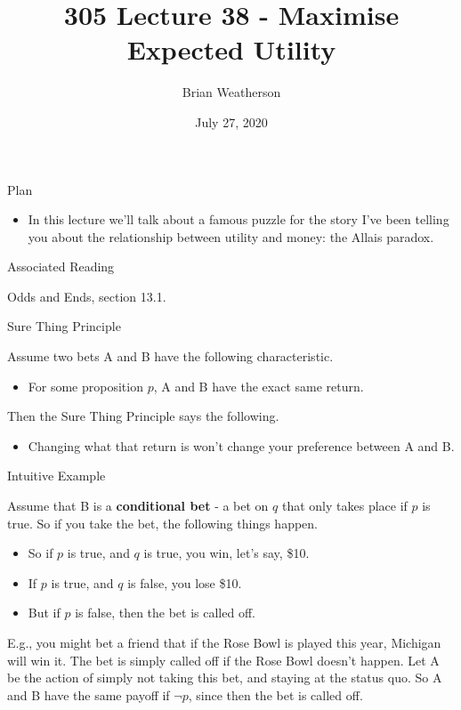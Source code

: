 \documentclass[
  ignorenonframetext,
]{beamer}
\title{305 Lecture 38 - Maximise Expected Utility}
\author{Brian Weatherson}
\date{July 27, 2020}
\providecommand{\tightlist}{%
  \setlength{\itemsep}{0pt}\setlength{\parskip}{0pt}}
\renewcommand{\,}{\text{, }}
\begin{document}
\frame{\titlepage}

\begin{frame}{Plan}
\protect\hypertarget{plan}{}

\begin{itemize}
\tightlist
\item
  In this lecture we'll talk about a famous puzzle for the story I've
  been telling you about the relationship between utility and money: the
  Allais paradox.
\end{itemize}

\end{frame}

\begin{frame}{Associated Reading}
\protect\hypertarget{associated-reading}{}

Odds and Ends, section 13.1.

\end{frame}

\begin{frame}{Sure Thing Principle}
\protect\hypertarget{sure-thing-principle}{}

Assume two bets A and B have the following characteristic.

\begin{itemize}
\tightlist
\item
  For some proposition \(p\), A and B have the exact same return. \pause
\end{itemize}

Then the Sure Thing Principle says the following.

\begin{itemize}
\tightlist
\item
  Changing what that return is won't change your preference between A
  and B.
\end{itemize}

\end{frame}

\begin{frame}{Intuitive Example}
\protect\hypertarget{intuitive-example}{}

Assume that B is a \textbf{conditional bet} - a bet on \(q\) that only
takes place if \(p\) is true. So if you take the bet, the following
things happen.

\begin{itemize}
\tightlist
\item
  So if \(p\) is true, and \(q\) is true, you win, let's say, \$10.
\item
  If \(p\) is true, and \(q\) is false, you lose \$10.
\item
  But if \(p\) is false, then the bet is called off.
\end{itemize}

E.g., you might bet a friend that if the Rose Bowl is played this year,
Michigan will win it. The bet is simply called off if the Rose Bowl
doesn't happen. Let A be the action of simply not taking this bet, and
staying at the status quo. So A and B have the same payoff if
\(\neg p\), since then the bet is called off.

\end{frame}
\end{document}
